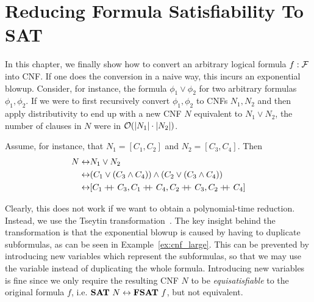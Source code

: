 
\chapter{Reducing Formula Satisfiability To SAT}\label{chap:fsat_sat}
In this chapter, we finally show how to convert an arbitrary logical formula $f : \mathcal{F}$ into CNF. 
If one does the conversion in a naive way, this incurs an exponential blowup. Consider, for instance, the formula $\phi_1 \lor \phi_2$ for two arbitrary formulas $\phi_1, \phi_2$. If we were to first recursively convert $\phi_1, \phi_2$ to CNFs $N_1, N_2$ and then apply distributivity to end up with a new CNF $N$ equivalent to $N_1 \lor N_2$, the number of clauses in $N$ were in $\mathcal{O}{(|N_1| \cdot |N_2|)}$. 
\begin{example}\label{ex:cnf_large}
  Assume, for instance, that $N_1 = [C_1, C_2]$ and $N_2 = [C_3, C_4]$. Then
  \begin{align*}
    N \leftrightarrow & N_1 \lor N_2 \\
    \leftrightarrow & (C_1 \lor (C_3 \land C_4)) \land (C_2 \lor (C_3 \land C_4)) \\
    \leftrightarrow & [C_1 \concat C_3, C_1 \concat C_4, C_2 \concat C_3, C_2 \concat C_4]
  \end{align*}
\end{example}

Clearly, this does not work if we want to obtain a polynomial-time reduction. Instead, we use the Tseytin transformation~\cite{Tseitin1983}. The key insight behind the transformation is that the exponential blowup is caused by having to duplicate subformulas, as can be seen in Example~\ref{ex:cnf_large}. This can be prevented by introducing new variables which represent the subformulas, so that we may use the variable instead of duplicating the whole formula.
Introducing new variables is fine since we only require the resulting CNF $N$ to be \emph{equisatisfiable} to the original formula $f$, i.e. $\textbf{SAT}{}~N \leftrightarrow \textbf{FSAT}{}~f$, but not equivalent.  

